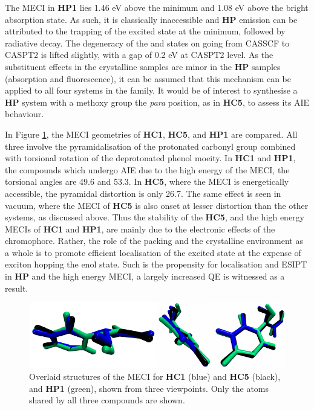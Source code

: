 The MECI in \textbf{HP1} lies 1.46 eV above the \Kstar{} minimum and 1.08 eV above the bright absorption state. As such, it is classically inaccessible and \textbf{HP} emission can be attributed to the trapping of the excited state at the \Kstar{} minimum, followed by radiative decay. The degeneracy of the \sone{} and \szero{} states on going from CASSCF to CASPT2 is lifted slightly, with a gap of 0.2 eV at CASPT2 level. As the substituent effects in the crystalline samples are minor in the \textbf{HP} samples (absorption and fluorescence), it can be assumed that this mechanism can be applied to all four systems in the family. It would be of interest to synthesise a \textbf{HP} system with a methoxy group the \textit{para} position, as in \textbf{HC5}, to assess its AIE behaviour.

In Figure \ref{figure: MECI_comparison}, the MECI geometries of \textbf{HC1}, \textbf{HC5}, and \textbf{HP1} are compared. All three involve the pyramidalisation of the protonated carbonyl group  combined with torsional rotation of the deprotonated phenol moeity. In \textbf{HC1} and \textbf{HP1}, the compounds which undergo AIE due to the high energy of the MECI, the torsional angles are 49.6\degree{} and 53.3\degree{}. In \textbf{HC5}, where the MECI is energetically accessible, the pyramidal distortion is only 26.7\degree{}. The same effect is seen in vacuum, where the MECI of \textbf{HC5} is also onset at lesser distortion than the other systems, as discussed above. Thus the stability of the \textbf{HC5}, and the high energy MECIs of \textbf{HC1} and \textbf{HP1}, are mainly due to the electronic effects of the chromophore. Rather, the role of the packing and the crystalline environment as a whole is to promote efficient localisation of the excited state at the expense of exciton hopping the enol state. Such is the propensity for localisation and ESIPT in \textbf{HP} and the high energy MECI, a largely increased QE is witnessed as a result.
\begin{figure}[H]
\centering
  \includegraphics[width=0.9\linewidth]{5ConnectingCrystalStructure/MECI_comparison.pdf}
  \caption[MECI geometries for \textbf{HC1},\textbf{HC5} \% \textbf{HP1}.]{Overlaid structures of the MECI for \textbf{HC1} (blue) and \textbf{HC5} (black), and \textbf{HP1} (green), shown from three viewpoints. Only the atoms shared by all three compounds are shown.}
  \label{figure: MECI_comparison}
\end{figure}
